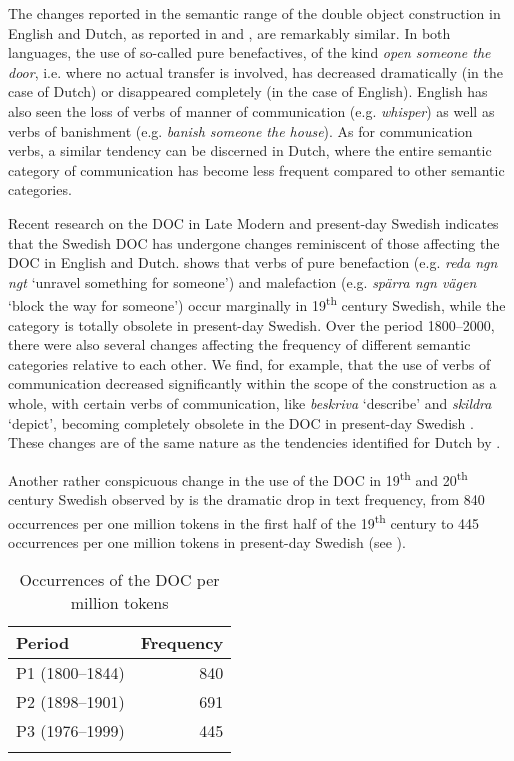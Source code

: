 \documentclass[output=paper]{langscibook}
\begin{document}
The changes reported in the semantic range of the double object construction in English and Dutch, as reported in  \citet{CollemanDe_Clerck2011} and \citet{Colleman2011}, are remarkably similar. In both languages, the use of so-called pure benefactives, of the kind \textit{open someone the door}, i.e. where no actual transfer is involved, has decreased dramatically (in the case of Dutch) or disappeared completely (in the case of English). English has also seen the loss of verbs of manner of communication (e.g. \textit{whisper}) as well as verbs of banishment (e.g. \textit{banish someone the house}). As for communication verbs, a similar tendency can be discerned in Dutch, where the entire semantic category of communication has become less frequent compared to other semantic categories.



Recent research on the DOC in Late Modern and present-day Swedish indicates that the Swedish DOC has undergone changes reminiscent of those affecting the DOC in English and Dutch. \textcite{ValdesonSubmitted} shows that verbs of pure benefaction (e.g. \textit{reda ngn ngt} ‘unravel something for someone’) and malefaction (e.g. \textit{spärra ngn vägen} ‘block the way for someone’) occur marginally in 19\textsuperscript{th} century Swedish, while the category is totally obsolete in present-day Swedish. Over the period 1800–2000, there were also several changes affecting the frequency of different semantic categories relative to each other. We find, for example, that the use of verbs of communication decreased significantly within the scope of the construction as a whole, with certain verbs of communication, like \textit{beskriva} ‘describe’ and \textit{skildra} ‘depict’, becoming completely obsolete in the DOC in present-day Swedish \parencite{ValdesonSubmitted}. These changes are of the same nature as the tendencies identified for Dutch by \citet{Colleman2011}.



Another rather conspicuous change in the use of the DOC in 19\textsuperscript{th} and 20\textsuperscript{th} century Swedish observed by \textcite{ValdesonSubmitted} is the dramatic drop in text frequency, from 840 occurrences per one million tokens in the first half of the 19\textsuperscript{th} century to 445 occurrences per one million tokens in present-day Swedish (see ).


\begin{table}
\caption{Occurrences of the DOC per million tokens \parencite{ValdesonSubmitted}\label{tab:valdeson:1}}
\begin{tabular}{lr}
\lsptoprule
Period & Frequency\\
\midrule
P1 (1800–1844) & 840\\
P2 (1898–1901) & 691\\
P3 (1976–1999) & 445\\
\lspbottomrule
\end{tabular}
\end{table}
\end{document}
